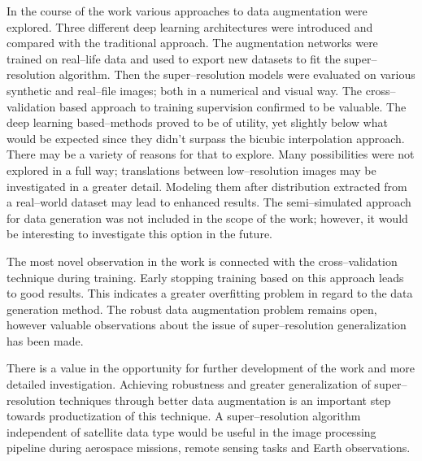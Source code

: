 In the course of the work various approaches to data augmentation were explored.
Three different deep learning architectures were introduced and compared with the traditional approach.
The augmentation networks were trained on real--life data and used to export new datasets to fit the super--resolution algorithm.
Then the super--resolution models were evaluated on various synthetic and real--file images; both in a numerical and visual way.
The cross--validation based approach to training supervision confirmed to be valuable.
The deep learning based--methods proved to be of utility, yet slightly below what would be expected since they didn't surpass the bicubic interpolation approach.
There may be a variety of reasons for that to explore.
Many possibilities were not explored in a full way; translations between low--resolution images may be investigated in a greater detail.
Modeling them after distribution extracted from a real--world dataset may lead to enhanced results.
The semi--simulated approach for data generation was not included in the scope of the work; however, it would be interesting to investigate this option in the future.

The most novel observation in the work is connected with the cross--validation technique during training.
Early stopping training based on this approach leads to good results.
This indicates a greater overfitting problem in regard to the data generation method.
The robust data augmentation problem remains open, however valuable observations about the issue of super--resolution generalization has been made.

There is a value in the opportunity for further development of the work and more detailed investigation.
Achieving robustness and greater generalization of super--resolution techniques through better data augmentation is an important step towards productization of this technique.
A super--resolution algorithm independent of satellite data type would be useful in the image  processing pipeline during aerospace missions, remote sensing tasks and Earth observations.
